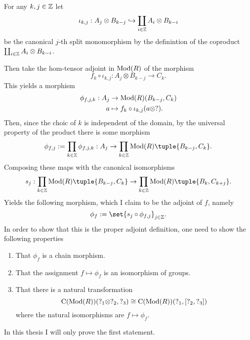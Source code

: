 \begin{remark}
\begin{center}
    \end{center}

    For any \( k, j \in {\mathbb{Z}} \) let
    \[
        \iota_{k, j}: A_j \otimes B_{k - j} \hookrightarrow \coprod_{i \in {\mathbb{Z}}} A_i \otimes B_{k - i}
    \]
    be the canonical \( j \)-th split monomorphism by the definintion of the coproduct \( \coprod_{i \in {\mathbb{Z}}} A_i \otimes B_{k - i} \).

    Then take the hom-tensor adjoint in \( \operatorname{Mod}(R) \) of the morphism
    \[
        f_k \circ \iota_{k, j}: A_j \otimes B_{k - j} \to C_k.
    \]
    This yields a morphism
    \begin{align*}
        \phi_{f, j, k}: A_j &\to \operatorname{Mod}(R)(B_{k - j}, C_k) \\
        a &\mapsto f_k \circ \iota_{k, j}(a \otimes ?).
    \end{align*}
    Then, since the choic of \( k \) is independent of the domain, by the universal property of the product there is some morphism
    \[
        \phi_{f, j} := \prod_{k \in \Zb} \phi_{f, j, k}: A_j \to \prod_{k \in \Zb} \Mod(R)\tuple{B_{k - j}, C_k}.
    \]
    Composing these maps with the canonical isomorphisms
    \[
        s_j: \prod_{k \in \Zb} \Mod(R)\tuple{B_{k - j}, C_k} \to \prod_{k \in \Zb} \Mod(R)\tuple{B_k, C_{k + j}}.
    \]
    Yields the following morphism, which I claim to be the adjoint of \( f \), namely 
    \[
        \phi_f := \set{s_j \circ \phi_{f, j}}_{j \in \Zb}.
    \]
    In order to show that this is the proper adjoint definition, one need to show the following properties
    \begin{enumerate}
        \item {
            That \( \phi_f \) is a chain morphism.
        }
        \item {
            That the assignment \( f \mapsto \phi_f \) is an isomorphism of groups.
        }
        \item {
            That there is a natural transformation
            \[
                \operatorname{C}(\operatorname{Mod}(R))(?_1 \otimes ?_2, ?_3) \cong \operatorname{C}(\operatorname{Mod}(R))(?_1, \left[ ?_2, ?_3 \right])
            \]
            where the natural isomorphisms are \( f \mapsto \phi_f \).
        }
    \end{enumerate}
    In this thesis I will only prove the first statement.


\end{remark}
